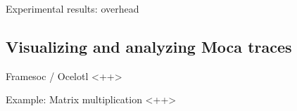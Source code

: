 \documentclass[xcolor={usenames,dvipsnames},hyperref={pdfusetitle}]{beamer}
\begin{document}
\begin{frame}{Experimental results: overhead}
    \pause
\end{frame}

\subsection{Visualizing and analyzing Moca traces}

\begin{frame}{Framesoc / Ocelotl}
    <++>
\end{frame}

\begin{frame}{Example: Matrix multiplication}
    <++>
\end{frame}
\end{document}
